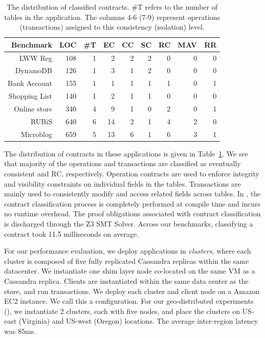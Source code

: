 \begin{table}
\setlength{\tabcolsep}{4pt}
\renewcommand{\arraystretch}{1.2}
{\sffamily
\begin{center}
\caption{The distribution of classified contracts. \#T refers to the number of
tables in the application. The columns 4-6 (7-9) represent operations
(transactions) assigned to this consistency (isolation) level.}
\label{tab:ctrts}
\begin{tabular} {rrrrrrrrr}
\hline
{\bf Benchmark} & {\bf LOC} & {\bf \#T} & {\bf EC} & {\bf CC} & {\bf SC} & {\bf RC} & {\bf MAV} & {\bf RR} \\
\hline
{LWW Reg} & 108 & 1 & 2 & 2 & 2 & 0 & 0 & 0 \\
{DynamoDB} & 126 & 1 & 3 & 1 & 2 & 0 & 0 & 0 \\
{Bank Account} & 155 & 1 & 1 & 1 & 1 & 1 & 0 & 1 \\
{Shopping List} & 140 & 1 & 2 & 1 & 1 & 0 & 0 & 0 \\
{Online store} & 340 & 4 & 9 & 1 & 0 & 2 & 0 & 1 \\
{RUBiS} & 640 & 6 & 14 & 2 & 1 & 4 & 2 & 0 \\
{Microblog} & 659 & 5 & 13 & 6 & 1 & 6 & 3 & 1 \\
\hline
\end{tabular}
\end{center} }
\end{table}

The distribution of contracts in these applications is given in
Table~\ref{tab:ctrts}. We see that majority of the operations and transactions
are classified as eventually consistent and RC, respectively. Operation
contracts are used to enforce integrity and visibility constraints on
individual fields in the tables. Transactions are mainly used to consistently
modify and access related fields across tables. In \name, the contract
classification process is completely performed at compile time and incurs no
runtime overhead. The proof obligations associated with contract
classification is discharged through the Z3 SMT Solver. Across our benchmarks,
classifying a contract took 11.5 milliseconds on average.

For our performance evaluation, we deploy \name applications in
\emph{clusters}, where each cluster is composed of five fully replicated
Cassandra replicas within the same datacenter. We instantiate one shim layer
node co-located on the same VM as a Cassandra replica. Clients are instantiated
within the same data center as the store, and run transactions. We deploy each
cluster and client node on a  Amazon EC2 instance. We call this
a  configuration. For our geo-distributed experiments (), we
instantiate 2 clusters, each with five nodes, and place the clusters on US-east
(Virginia) and US-west (Oregon) locations. The average inter-region latency was
85ms.

